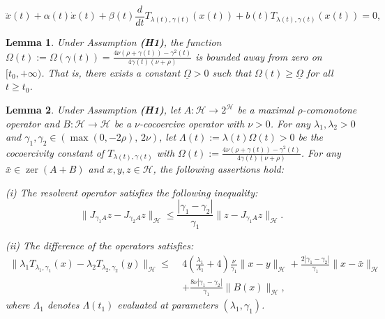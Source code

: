 \documentclass[10pt,a4paper]{amsart}
\newtheorem{lemma}{Lemma}
\begin{document}
\begin{equation}
\label{eq:SHDS}
\ddot{x}(t) + \alpha(t)\dot{x}(t) + \beta(t)\frac{d}{dt}T_{\lambda(t), \gamma(t)}(x(t)) + b(t)T_{\lambda(t), \gamma(t)}(x(t)) = 0,
\end{equation}

\begin{lemma}
\label{prop:omega_uniform_positivity}
Under Assumption {\bf (H1)}, the function 
$\Omega(t) := \Omega(\gamma(t)) = \frac{4\nu(\rho + \gamma(t)) - \gamma^2(t)}{4\gamma(t)(\nu + \rho)}$ 
is bounded away from zero on $[t_0, +\infty)$. That is, there exists a constant $\underline{\Omega} > 0$ such that $\Omega(t) \ge \underline{\Omega}$ for all $t \ge t_0$.
\end{lemma}

\begin{lemma}
\label{lem:sharp_sensitivity_final}
Under Assumption {\rm {\bf (H1)}}, let $A: \mathcal{H} \to 2^{\mathcal{H}}$ be a maximal $\rho$-comonotone operator and $B: \mathcal{H} \to \mathcal{H}$ be a $\nu$-cocoercive operator with $\nu > 0$. For any $\lambda_1, \lambda_2 > 0$ and $\gamma_1, \gamma_2 \in \left( \max(0, -2\rho), \, 2\nu \right)$, let $\Lambda(t) := \lambda(t) \Omega(t) > 0$ be the cocoercivity constant of $T_{\lambda(t), \gamma(t)}$ with $\Omega(t) := \frac{4\nu \left( \rho + \gamma(t) \right) - \gamma^2(t)}{4\gamma(t) \left( \nu + \rho \right)}$. For any $\bar{x} \in \operatorname{zer}(A+B)$ and $x, y, z \in \mathcal{H}$, the following assertions hold:

{\rm (i)} The resolvent operator satisfies the following inequality:
\begin{equation}\label{eq:resolvent_sensitivity_standard}
\| J_{\gamma_1 A} z - J_{\gamma_2 A} z \|_{\mathcal{H}} \leq \frac{|\gamma_1 - \gamma_2|}{\gamma_1} \| z - J_{\gamma_1 A} z \|_{\mathcal{H}}.
\end{equation}

{\rm (ii)} The difference of the operators satisfies:
\begin{align}
\|\lambda_{1} T_{\lambda_{1}, \gamma_{1}}(x) - \lambda_{2} T_{\lambda_{2}, \gamma_{2}}(y)\|_{\mathcal{H}} \leq \;& 4 \left( \frac{\lambda_1}{\Lambda_1} + 4 \right)\frac{\nu}{\gamma_1} \|x - y\|_{\mathcal{H}} + \frac{2 |\gamma_{1} - \gamma_{2}|}{\gamma_{1}} \| x - \bar{x} \|_{\mathcal{H}} \nonumber \\
& + \frac{8\nu |\gamma_{1} - \gamma_{2}|}{\gamma_{1}} \|B(x)\|_{\mathcal{H}}, \label{eq:asymptotic_consistent_form}
\end{align}
where $\Lambda_1$ denotes $\Lambda(t_1)$ evaluated at parameters $(\lambda_1, \gamma_1)$.


\end{lemma}
\end{document}
